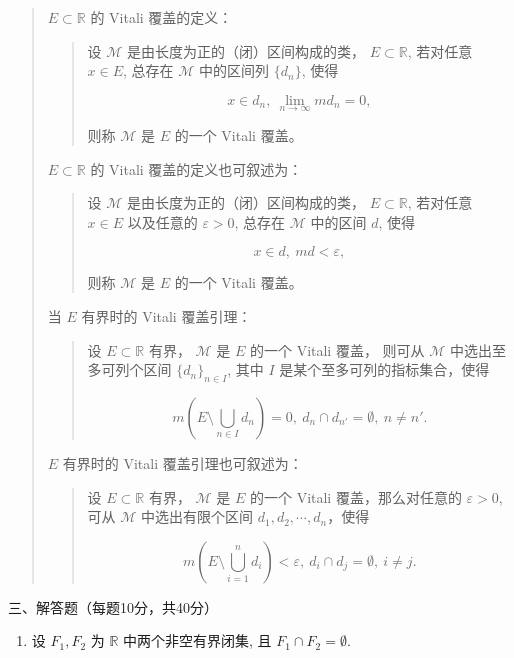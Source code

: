 \documentclass[
]{article}
\providecommand{\tightlist}{%
  \setlength{\itemsep}{0pt}\setlength{\parskip}{0pt}}
\begin{document}
\begin{quote}
\(E\subset \mathbb{R}\) 的 Vitali 覆盖的定义：

\begin{quote}
设 \(\mathscr{M}\) 是由长度为正的（闭）区间构成的类，
\(E \subset \mathbb{R}\), 若对任意 \(x \in E\), 总存在 \(\mathscr{M}\)
中的区间列 \(\{d_n\}\), 使得

\[x \in d_n, ~ \lim\limits_{n\to\infty} m d_n = 0,\]

则称 \(\mathscr{M}\) 是 \(E\) 的一个 Vitali 覆盖。
\end{quote}

\(E\subset \mathbb{R}\) 的 Vitali 覆盖的定义也可叙述为：

\begin{quote}
设 \(\mathscr{M}\) 是由长度为正的（闭）区间构成的类，
\(E \subset \mathbb{R}\), 若对任意 \(x \in E\) 以及任意的
\(\varepsilon > 0\), 总存在 \(\mathscr{M}\) 中的区间 \(d\), 使得

\[x \in d, ~ m d < \varepsilon,\]

则称 \(\mathscr{M}\) 是 \(E\) 的一个 Vitali 覆盖。
\end{quote}

当 \(E\) 有界时的 Vitali 覆盖引理：

\begin{quote}
设 \(E \subset \mathbb{R}\) 有界， \(\mathscr{M}\) 是 \(E\) 的一个
Vitali 覆盖， 则可从 \(\mathscr{M}\) 中选出至多可列个区间
\(\{d_n\}_{n \in I}\), 其中 \(I\) 是某个至多可列的指标集合，使得

\[m \left( E \setminus \bigcup\limits_{n \in I} d_n \right) = 0, ~ d_n \cap d_{n'} = \emptyset, ~ n \neq n'.\]
\end{quote}

\(E\) 有界时的 Vitali 覆盖引理也可叙述为：

\begin{quote}
设 \(E \subset \mathbb{R}\) 有界， \(\mathscr{M}\) 是 \(E\) 的一个
Vitali 覆盖，那么对任意的 \(\varepsilon > 0\), 可从 \(\mathscr{M}\)
中选出有限个区间 \(d_1, d_2, \cdots, d_n\)，使得

\[m \left( E \setminus \bigcup\limits_{i=1}^n d_i \right) < \varepsilon, ~ d_i \cap d_j = \emptyset, ~ i \neq j.\]
\end{quote}
\end{quote}

三、解答题（每题10分，共40分）

\begin{enumerate}
\def\labelenumi{\arabic{enumi}.}
\tightlist
\item
  设 \(F_1, F_2\) 为 \(\mathbb{R}\) 中两个非空有界闭集, 且
  \(F_1 \cap F_2 = \emptyset\).
\end{enumerate}
\end{document}
